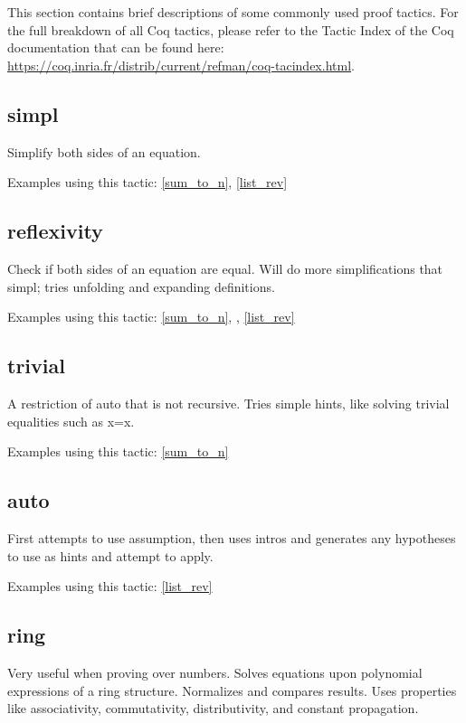 
This section contains brief descriptions of some commonly used proof tactics.
For the full breakdown of all Coq tactics, please refer to the Tactic Index of the Coq documentation that can be found here:
\url{https://coq.inria.fr/distrib/current/refman/coq-tacindex.html}.


\subsection{simpl} \label{simpl}
Simplify both sides of an equation.

\noindent
Examples using this tactic: 
\ref{sum_to_n}, \ref{list_rev}




\subsection{reflexivity} \label{reflexivity}
Check if both sides of an equation are equal. 
Will do more simplifications that simpl; tries unfolding and expanding definitions.

\noindent
Examples using this tactic: 
\ref{sum_to_n}, , \ref{list_rev}




\subsection{trivial} \label{trivial}
A restriction of auto that is not recursive. 
Tries simple hints, like solving trivial equalities such as x=x.

\noindent
Examples using this tactic: 
\ref{sum_to_n}



\subsection{auto} \label{auto}
First attempts to use assumption, then uses intros and generates any hypotheses to use as hints and attempt to apply.

\noindent
Examples using this tactic: 
\ref{list_rev}


\subsection{ring} \label{ring}
Very useful when proving over numbers.
Solves equations upon polynomial expressions of a ring structure. 
Normalizes and compares results.
Uses properties like associativity, commutativity, distributivity, and constant propagation.

